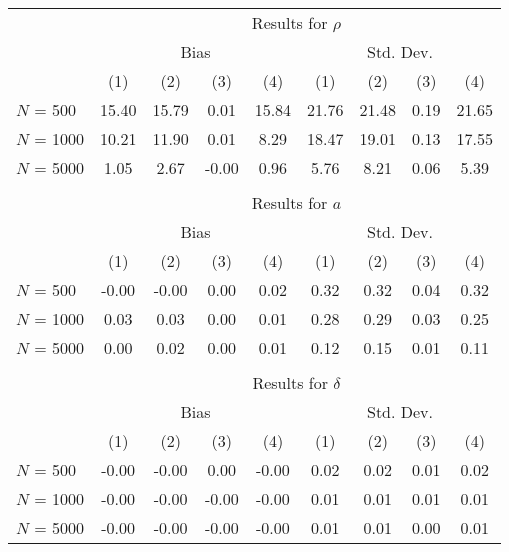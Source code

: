 \begin{tabular}{lcccccccc} \\\toprule
 & \multicolumn{8}{c}{Results for $\rho$} \\ 
 & \multicolumn{4}{c}{Bias} & \multicolumn{4}{c}{Std. Dev.} \\ 
& (1)& (2)& (3)& (4)& (1)& (2)& (3)& (4)\\ 
\cmidrule(r){2-5}\cmidrule(r){6-9}$N$ = 500 & 15.40 & 15.79 & 0.01 & 15.84 & 21.76 & 21.48 & 0.19 & 21.65\\ 
$N$ = 1000 & 10.21 & 11.90 & 0.01 & 8.29 & 18.47 & 19.01 & 0.13 & 17.55\\ 
$N$ = 5000 & 1.05 & 2.67 & -0.00 & 0.96 & 5.76 & 8.21 & 0.06 & 5.39\\ 
&&&&&&&& \\ 
 & \multicolumn{8}{c}{Results for $a$} \\ 
 & \multicolumn{4}{c}{Bias} & \multicolumn{4}{c}{Std. Dev.} \\ 
& (1)& (2)& (3)& (4)& (1)& (2)& (3)& (4)\\ 
\cmidrule(r){2-5}\cmidrule(r){6-9}$N$ = 500 & -0.00 & -0.00 & 0.00 & 0.02 & 0.32 & 0.32 & 0.04 & 0.32\\ 
$N$ = 1000 & 0.03 & 0.03 & 0.00 & 0.01 & 0.28 & 0.29 & 0.03 & 0.25\\ 
$N$ = 5000 & 0.00 & 0.02 & 0.00 & 0.01 & 0.12 & 0.15 & 0.01 & 0.11\\ 
&&&&&&&& \\ 
 & \multicolumn{8}{c}{Results for $\delta$} \\ 
 & \multicolumn{4}{c}{Bias} & \multicolumn{4}{c}{Std. Dev.} \\ 
& (1)& (2)& (3)& (4)& (1)& (2)& (3)& (4)\\ 
\cmidrule(r){2-5}\cmidrule(r){6-9}$N$ = 500 & -0.00 & -0.00 & 0.00 & -0.00 & 0.02 & 0.02 & 0.01 & 0.02\\ 
$N$ = 1000 & -0.00 & -0.00 & -0.00 & -0.00 & 0.01 & 0.01 & 0.01 & 0.01\\ 
$N$ = 5000 & -0.00 & -0.00 & -0.00 & -0.00 & 0.01 & 0.01 & 0.00 & 0.01\\ 
\bottomrule\end{tabular}
